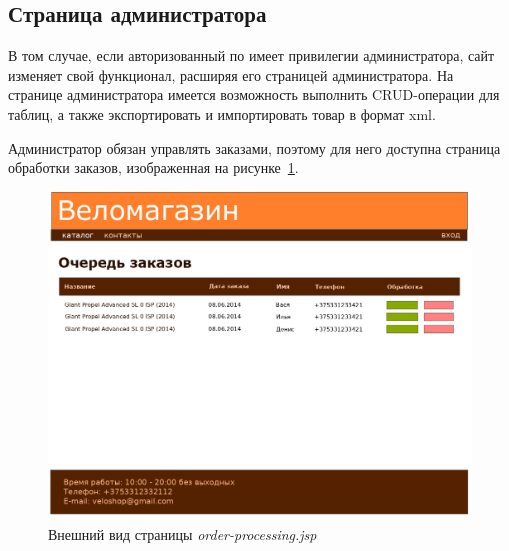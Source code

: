 \subsection{Страница администратора}

В том случае, если авторизованный по имеет привилегии администратора, сайт
изменяет свой функционал, расширяя его страницей администратора. На странице
администратора имеется возможность выполнить CRUD-операции для таблиц, а также
экспортировать и импортировать товар в формат xml.

\pagebreak

Администратор обязан управлять заказами, поэтому для него доступна страница
обработки заказов, изображенная на рисунке~\ref{fig:order-processing_jsp}.

\begin{figure}[h]
  \centering
  \includegraphics[width=160mm]{pic/order_processing_template.png}
  \caption{Внешний вид страницы \textit{order-processing.jsp}}
  \label{fig:order-processing_jsp}
\end{figure}

\pagebreak
